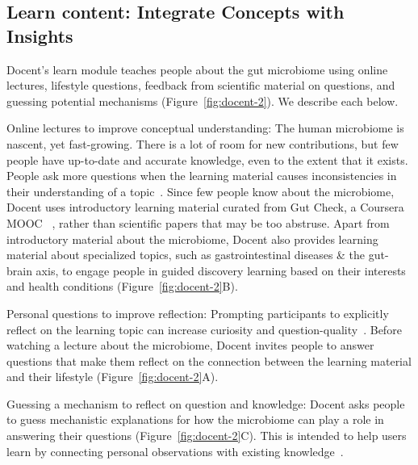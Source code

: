 \subsection{Learn content: Integrate Concepts with Insights}
Docent’s learn module teaches people about the gut microbiome using online lectures, lifestyle questions, feedback from scientific material on questions, and guessing potential mechanisms (Figure~\ref{fig:docent-2}). We describe each below. 


Online lectures to improve conceptual understanding: The human microbiome is nascent, yet fast-growing. There is a lot of room for new contributions, but few people have up-to-date and accurate knowledge, even to the extent that it exists. People ask more questions when the learning material causes inconsistencies in their understanding of a topic~\cite{Miyake1979a}. Since few people know about the microbiome, Docent uses introductory learning material curated from Gut Check, a Coursera MOOC ~\cite{Knight2016}, rather than scientific papers that may be too abstruse. Apart from introductory material about the microbiome, Docent also provides learning material about specialized topics, such as gastrointestinal diseases \& the gut-brain axis, to engage people in guided discovery learning based on their interests and health conditions (Figure~\ref{fig:docent-2}B).

 Personal questions to improve reflection: Prompting participants to explicitly reflect on the learning topic can increase curiosity and question-quality~\cite{Aleven2006, Law2016}. Before watching a lecture about the microbiome, Docent invites people to answer questions that make them reflect on the connection between the learning material and their lifestyle (Figure~\ref{fig:docent-2}A).

Guessing a mechanism to reflect on question and knowledge: Docent asks people to guess mechanistic explanations for how the microbiome can play a role in answering their questions (Figure~\ref{fig:docent-2}C). This is intended to help users learn by connecting personal observations with existing knowledge~\cite{Simon2004}.

